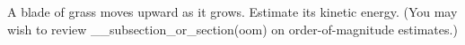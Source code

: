 A blade of grass moves upward as it grows. Estimate its
kinetic energy.
(You may wish to review 
__subsection_or_section(oom) on order-of-magnitude estimates.)
